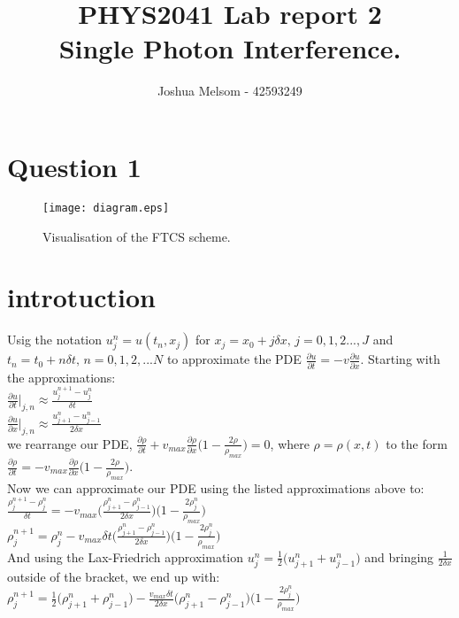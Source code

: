 \documentclass[11pt]{article} %
\title{PHYS2041 Lab report 2\\ Single Photon Interference.}
\author{Joshua Melsom - 42593249}
\date{}
\begin{document}


\section{Question 1}
\begin{figure}[!h]
\centering
\texttt{[image: diagram.eps]}
\caption{Visualisation of the FTCS scheme.}
\label{fig:appi}
\end{figure}
\section {introtuction}
Usig the notation $u^n _j = u(t_n, x_j)$ for $x_j = x_0 + j\delta x, \, j=0,1,2...,J$ and $t_n = t_0 + n\delta t, \, n=0,1,2,...N$ to approximate the PDE $\frac{\partial u}{\partial t} = -v\frac{\partial u}{\partial x}$. Starting with the approximations: \\


$\displaystyle{\frac{\partial u}{\partial t}  \bigg|_{j,n} \approx \frac{u^{n+1}_j - u^n _j}{\delta t}}$\\ [0.5em]

$\displaystyle{\frac{\partial u}{\partial x} \bigg| _{j,n} \approx \frac{u^n_{j+1} - u^n_{j-1}}{2\delta x}}$\\[0.5em]

we rearrange our PDE, $\displaystyle{\frac{\partial \rho}{\partial t} + v_{max} \frac{\partial \rho}{\partial x} \bigg ( 1-\frac{2\rho}{\rho _{max}} \bigg) = 0}$, where $\rho= \rho (x,t)$ to the form \\

$\displaystyle{\frac{\partial \rho}{\partial t} = - v_{max} \frac{\partial \rho}{\partial x} \bigg ( 1-\frac{2\rho}{\rho _{max}} \bigg)}$.\\

Now we can approximate our PDE using the listed approximations above to: \\

$\displaystyle{\frac{\rho ^{n+1}_j - \rho^n _j}{\delta t} = -v_{max} \bigg ( \frac{\rho^n_{j+1} - \rho^n_{j-1}}{2\delta x} \bigg ) \bigg (1-\frac{2 \rho^n _j}{\rho_{max}} \bigg )}$\\ [0.5em]

$\displaystyle{\rho^{n+1}_j = \rho ^n _j - v_{max}\delta t   \bigg ( \frac{\rho^n_{j+1} - \rho^n_{j-1}}{2\delta x} \bigg ) \bigg (1-\frac{2 \rho^n _j}{\rho_{max}} \bigg )}$ \\[0.5em]

And using the Lax-Friedrich approximation $u^n _j = \frac{1}{2} \bigg (  u^n _{j+1} + u^n_{j-1}  \bigg )$ and bringing $\frac{1}{2\delta x}$ outside of the bracket, we end up with:\\[0.5em]

$\displaystyle{\rho^{n+1}_j =  \frac{1}{2} \bigg (  \rho^n _{j+1} + \rho^n_{j-1}  \bigg ) - \frac{v_{max}\delta t}{2\delta x}   \big ( \rho^n_{j+1} - \rho^n_{j-1} \big ) \bigg (1-\frac{2 \rho^n _j}{\rho_{max}} \bigg )}$ \\[0.5em]
\end{document}
